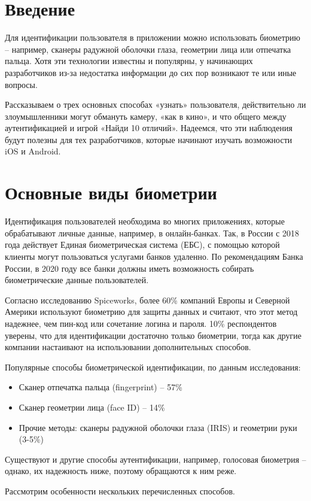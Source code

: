 \documentclass[a4paper,12pt]{extreport}
\begin{document}
\section{Введение}
Для идентификации пользователя в приложении можно использовать биометрию – например, сканеры радужной оболочки глаза, геометрии лица или отпечатка пальца. Хотя эти технологии известны и популярны, у начинающих разработчиков из-за недостатка информации до сих пор возникают те или иные вопросы.

Рассказываем о трех основных способах «узнать» пользователя, действительно ли злоумышленники могут обмануть камеру, «как в кино», и что общего между аутентификацией и игрой «Найди 10 отличий». Надеемся, что эти наблюдения будут полезны для тех разработчиков, которые начинают изучать возможности iOS и Android.

\section{Основные виды биометрии}
Идентификация пользователей необходима во многих приложениях, которые обрабатывают личные данные, например, в онлайн-банках. Так, в России с 2018 года действует Единая биометрическая система (ЕБС), с помощью которой клиенты могут пользоваться услугами банков удаленно. По рекомендациям Банка России, в 2020 году все банки должны иметь возможность собирать биометрические данные пользователей.

Согласно исследованию Spiceworks, более 60\% компаний Европы и Северной Америки используют биометрию для защиты данных и считают, что этот метод надежнее, чем пин-код или сочетание логина и пароля. 10\% респондентов уверены, что для идентификации достаточно только биометрии, тогда как другие компании настаивают на использовании дополнительных способов.

Популярные способы биометрической идентификации, по данным исследования:
\begin{itemize}
	\item Сканер отпечатка пальца (fingerprint) – 57\%
	\item Сканер геометрии лица (face ID) – 14\%
	\item Прочие методы: сканеры радужной оболочки глаза (IRIS) и геометрии руки (3-5\%)
\end{itemize}
Существуют и другие способы аутентификации, например, голосовая биометрия – однако, их надежность ниже, поэтому обращаются к ним реже.

Рассмотрим особенности нескольких перечисленных способов.
\end{document}
